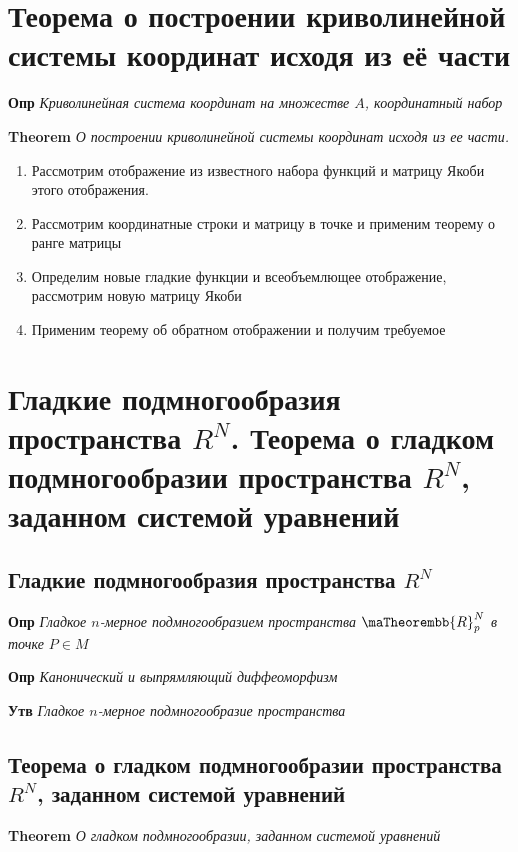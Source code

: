 \documentclass[a4paper, 14pt]{article}
\begin{document}
    \section{Теорема о построении криволинейной системы координат исходя из её части}
    
    \textbf{Опр} \textit{Криволинейная система координат на множестве $A$, координатный набор}
    
    \textbf{Theorem} \textit{О построении криволинейной системы координат исходя из ее части.}
    
    \begin{enumerate}
        \item Рассмотрим отображение из известного набора функций и матрицу Якоби этого отображения.
        \item Рассмотрим координатные строки и матрицу в точке и применим теорему о ранге матрицы
        \item Определим новые гладкие функции и всеобъемлющее отображение, рассмотрим новую матрицу Якоби
        \item Применим теорему об обратном отображении и получим требуемое
    \end{enumerate}
    
    \section{Гладкие подмногообразия пространства $R^N$.
    Теорема о гладком подмногообразии пространства $R^N$, заданном системой уравнений}
    
    \subsection{Гладкие подмногообразия пространства $R^N$}
    
    \textbf{Опр} \textit{Гладкое $n$-мерное подмногообразием пространства $\maTheorembb{R}^N_p$ в точке $P \in M$}
    
    \textbf{Опр} \textit{Канонический и выпрямляющий диффеоморфизм}
    
    \textbf{Утв} \textit{Гладкое $n$-мерное подмногообразие пространства}
    
    \subsection{Теорема о гладком подмногообразии пространства $R^N$, заданном системой уравнений}
    
    \textbf{Theorem} \textit{О гладком подмногообразии, заданном системой уравнений}
    
\end{document}
